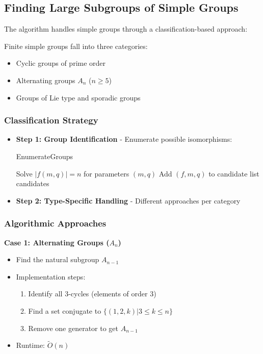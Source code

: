 \documentclass[sigconf]{acmart}
\begin{document}
\subsection{Finding Large Subgroups of Simple Groups}
\label{sec:simple-subgroups}

The algorithm handles simple groups through a classification-based approach:

\begin{definition}
Finite simple groups fall into three categories:
\begin{itemize}
    \item Cyclic groups of prime order
    \item Alternating groups $A_n$ ($n \geq 5$)
    \item Groups of Lie type and sporadic groups
\end{itemize}
\end{definition}

\subsubsection{Classification Strategy}
\begin{itemize}
    \item \textbf{Step 1: Group Identification} - Enumerate possible isomorphisms:
    \begin{algorithm}[H]
    \caption{EnumerateGroups}
    \begin{algorithmic}[1]
        \STATE Solve $|f(m,q)| = n$ for parameters $(m,q)$
            \STATE Add $(f,m,q)$ to candidate list
        \ENDIF
    \ENDFOR
    \RETURN candidates
    \end{algorithmic}
    \end{algorithm}
    
    \item \textbf{Step 2: Type-Specific Handling} - Different approaches per category
\end{itemize}

\subsubsection{Algorithmic Approaches}

\textbf{Case 1: Alternating Groups ($A_n$)}
\begin{itemize}
    \item Find the natural subgroup $A_{n-1}$
    \item Implementation steps:
    \begin{enumerate}
        \item Identify all 3-cycles (elements of order 3)
        \item Find a set conjugate to $\{(1,2,k) | 3 \leq k \leq n\}$
        \item Remove one generator to get $A_{n-1}$
    \end{enumerate}
    \item Runtime: $\widetilde{O}(n)$
\end{itemize}
\end{document}
